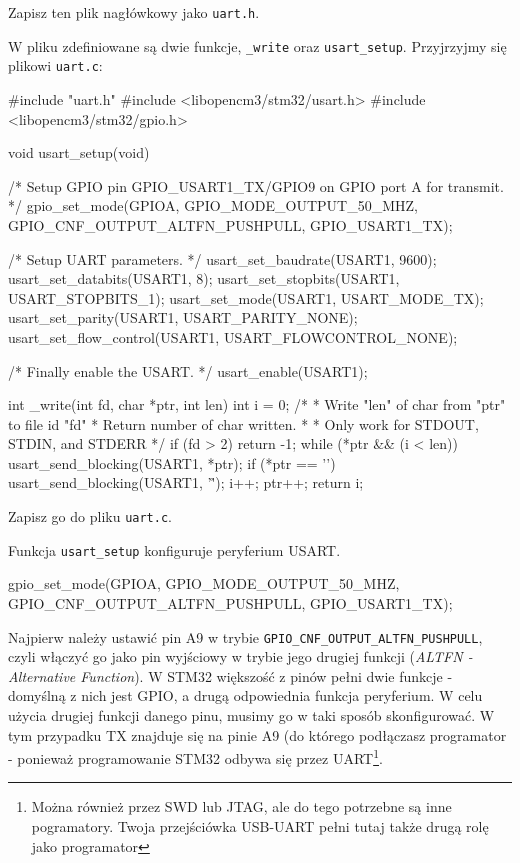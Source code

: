 \documentclass{pdfBooklets}
\begin{document}
Zapisz ten plik nagłówkowy jako \Verb$uart.h$.

W pliku zdefiniowane są dwie funkcje, \Verb$_write$ oraz \Verb$usart_setup$. Przyjrzyjmy się plikowi \Verb$uart.c$:
\begin{CodeFrame*}[c]{}
#include "uart.h"
#include <libopencm3/stm32/usart.h>
#include <libopencm3/stm32/gpio.h>


void usart_setup(void)
{
	/* Setup GPIO pin GPIO_USART1_TX/GPIO9 on GPIO port A for transmit. */
	gpio_set_mode(GPIOA, GPIO_MODE_OUTPUT_50_MHZ,
		      GPIO_CNF_OUTPUT_ALTFN_PUSHPULL, GPIO_USART1_TX);

	/* Setup UART parameters. */
	usart_set_baudrate(USART1, 9600);
	usart_set_databits(USART1, 8);
	usart_set_stopbits(USART1, USART_STOPBITS_1);
	usart_set_mode(USART1, USART_MODE_TX);
	usart_set_parity(USART1, USART_PARITY_NONE);
	usart_set_flow_control(USART1, USART_FLOWCONTROL_NONE);

	/* Finally enable the USART. */
	usart_enable(USART1);
}

int _write(int fd, char *ptr, int len){
	int i = 0;
	/*
	 * Write "len" of char from "ptr" to file id "fd"
	 * Return number of char written.
	 *
	 * Only work for STDOUT, STDIN, and STDERR
	 */
	if (fd > 2) {
	      return -1;
	}
	while (*ptr && (i < len)) {
	  	usart_send_blocking(USART1, *ptr);
		if (*ptr == '\n') {
			usart_send_blocking(USART1, '\r');
		}
		i++; 
		ptr++;
	}
	return i;
}

\end{CodeFrame*}

Zapisz go do pliku \Verb$uart.c$.

Funkcja \Verb$usart_setup$ konfiguruje peryferium USART.

\begin{CodeFrame*}[c]{}
gpio_set_mode(GPIOA, GPIO_MODE_OUTPUT_50_MHZ,
              GPIO_CNF_OUTPUT_ALTFN_PUSHPULL, GPIO_USART1_TX);
\end{CodeFrame*}

Najpierw należy ustawić pin A9 w trybie \Verb$GPIO_CNF_OUTPUT_ALTFN_PUSHPULL$, czyli włączyć go jako
pin wyjściowy w trybie jego drugiej funkcji (\emph{ALTFN - Alternative Function}). W STM32 większość z pinów pełni dwie funkcje - domyślną z nich jest
GPIO, a drugą odpowiednia funkcja peryferium. W celu użycia drugiej funkcji danego pinu, musimy go w taki sposób skonfigurować. W tym przypadku
TX znajduje się na pinie A9 (do którego podłączasz programator - ponieważ programowanie STM32 odbywa się przez UART\footnote{Można również przez
SWD lub JTAG, ale do tego potrzebne są inne pogramatory. Twoja przejściówka USB-UART pełni tutaj także drugą rolę jako programator}.
\end{document}
